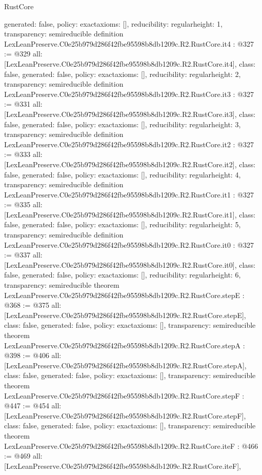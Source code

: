 \begin{lexlean}{RustCore}
\begin{coremodule}
{  generated: false,
  policy: exact{axioms: []},
  reducibility: regular{height: 1},
  transparency: semireducible
}
definition LexLeanPreserve.C0e25b979d286f42fbe95598b8db1209c.R2.RustCore.it4 : @327 := @329 {
  all: [LexLeanPreserve.C0e25b979d286f42fbe95598b8db1209c.R2.RustCore.it4],
  class: false,
  generated: false,
  policy: exact{axioms: []},
  reducibility: regular{height: 2},
  transparency: semireducible
}
definition LexLeanPreserve.C0e25b979d286f42fbe95598b8db1209c.R2.RustCore.it3 : @327 := @331 {
  all: [LexLeanPreserve.C0e25b979d286f42fbe95598b8db1209c.R2.RustCore.it3],
  class: false,
  generated: false,
  policy: exact{axioms: []},
  reducibility: regular{height: 3},
  transparency: semireducible
}
definition LexLeanPreserve.C0e25b979d286f42fbe95598b8db1209c.R2.RustCore.it2 : @327 := @333 {
  all: [LexLeanPreserve.C0e25b979d286f42fbe95598b8db1209c.R2.RustCore.it2],
  class: false,
  generated: false,
  policy: exact{axioms: []},
  reducibility: regular{height: 4},
  transparency: semireducible
}
definition LexLeanPreserve.C0e25b979d286f42fbe95598b8db1209c.R2.RustCore.it1 : @327 := @335 {
  all: [LexLeanPreserve.C0e25b979d286f42fbe95598b8db1209c.R2.RustCore.it1],
  class: false,
  generated: false,
  policy: exact{axioms: []},
  reducibility: regular{height: 5},
  transparency: semireducible
}
definition LexLeanPreserve.C0e25b979d286f42fbe95598b8db1209c.R2.RustCore.it0 : @327 := @337 {
  all: [LexLeanPreserve.C0e25b979d286f42fbe95598b8db1209c.R2.RustCore.it0],
  class: false,
  generated: false,
  policy: exact{axioms: []},
  reducibility: regular{height: 6},
  transparency: semireducible
}
theorem LexLeanPreserve.C0e25b979d286f42fbe95598b8db1209c.R2.RustCore.stepE : @368 := @375 {
  all: [LexLeanPreserve.C0e25b979d286f42fbe95598b8db1209c.R2.RustCore.stepE],
  class: false,
  generated: false,
  policy: exact{axioms: []},
  transparency: semireducible
}
theorem LexLeanPreserve.C0e25b979d286f42fbe95598b8db1209c.R2.RustCore.stepA : @398 := @406 {
  all: [LexLeanPreserve.C0e25b979d286f42fbe95598b8db1209c.R2.RustCore.stepA],
  class: false,
  generated: false,
  policy: exact{axioms: []},
  transparency: semireducible
}
theorem LexLeanPreserve.C0e25b979d286f42fbe95598b8db1209c.R2.RustCore.stepF : @447 := @454 {
  all: [LexLeanPreserve.C0e25b979d286f42fbe95598b8db1209c.R2.RustCore.stepF],
  class: false,
  generated: false,
  policy: exact{axioms: []},
  transparency: semireducible
}
theorem LexLeanPreserve.C0e25b979d286f42fbe95598b8db1209c.R2.RustCore.iteF : @466 := @469 {
  all: [LexLeanPreserve.C0e25b979d286f42fbe95598b8db1209c.R2.RustCore.iteF],
}
\end{coremodule}
\end{lexlean}

